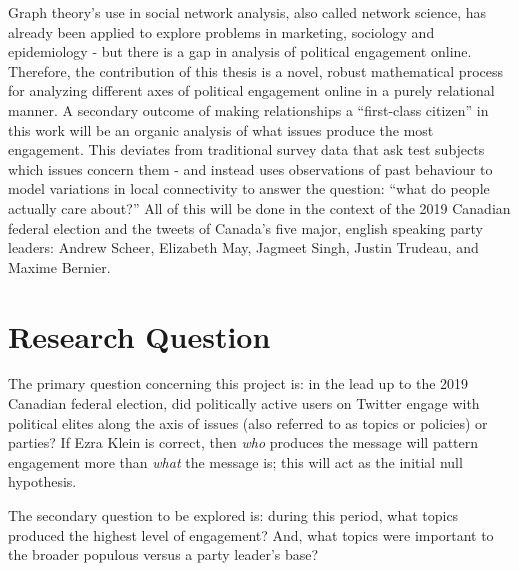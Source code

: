 Graph theory’s use in social network analysis, also called network science, has already been applied to explore problems in marketing, sociology and epidemiology - but there is a gap in analysis of political engagement online. Therefore, the contribution of this thesis is a novel, robust mathematical process for analyzing different axes of political engagement online in a purely relational manner. A secondary outcome of making relationships a “first-class citizen” in this work will be an organic analysis of what issues produce the most engagement. This deviates from traditional survey data that ask test subjects which issues concern them - and instead uses observations of past behaviour to model variations in local connectivity to answer the question: “what do people actually care about?” All of this will be done in the context of the 2019 Canadian federal election and the tweets of Canada's five major, english speaking party leaders: Andrew Scheer, Elizabeth May, Jagmeet Singh, Justin Trudeau, and Maxime Bernier. 

\section{Research Question}

The primary question concerning this project is: in the lead up to the 2019 Canadian federal election, did politically active users on Twitter engage with political elites along the axis of issues (also referred to as topics or policies) or parties? If Ezra Klein is correct, then \emph{who} produces the message will pattern engagement more than \emph{what} the message is; this will act as the initial null hypothesis. 

The secondary question to be explored is: during this period, what topics produced the highest level of engagement? And, what topics were important to the broader populous versus a party leader’s base?

%